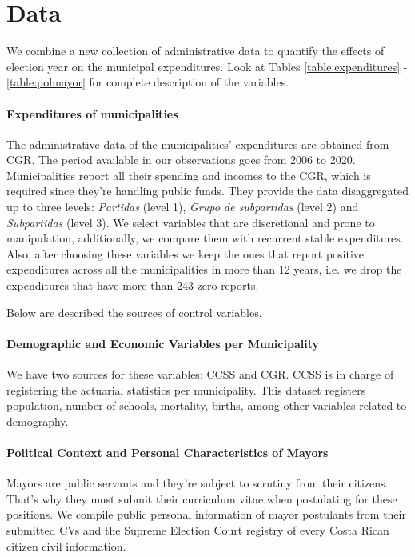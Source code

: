 \section{Data}

We combine a new collection of administrative data to quantify the effects of  election year on the municipal expenditures. Look at Tables \ref{table:expenditures} - \ref{table:polmayor} for complete description of the variables. 

\paragraph{Expenditures of municipalities} 

The administrative data of the municipalities' expenditures are obtained from CGR. The period available in our observations goes from 2006 to 2020. Municipalities report all their spending and incomes to the CGR, which is required since they're handling public funds. They provide the data disaggregated up to three levels: \textit{Partidas} (level 1), \textit{Grupo de subpartidas} (level 2) and \textit{Subpartidas} (level 3). We select variables that are discretional and prone to manipulation, additionally, we compare them with recurrent stable expenditures. Also, after choosing these variables we keep the ones that report positive expenditures across all the municipalities in more than 12 years, i.e. we drop the expenditures that have more than 243 zero reports. 

Below are described the sources of control variables. 
\paragraph{Demographic and Economic Variables per Municipality}
We have two sources for these variables: CCSS and CGR. CCSS is in charge of registering the actuarial statistics per municipality. This dataset registers population, number of schools, mortality, births, among other variables related to demography. 

\paragraph{Political Context and Personal Characteristics of Mayors}
Mayors are public servants and they're subject to scrutiny from their citizens. That's why they must submit their curriculum vitae when postulating for these positions. We compile public personal information of mayor postulants from their submitted CVs and the Supreme Election Court registry of every Costa Rican citizen civil information. 

